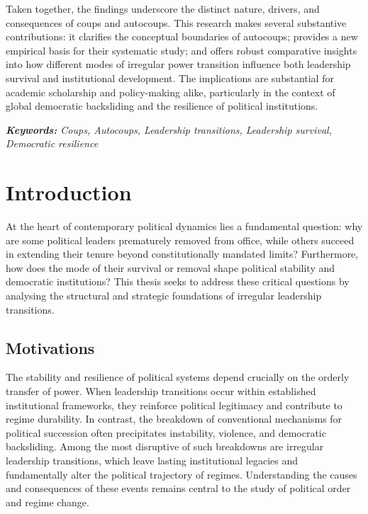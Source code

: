 \documentclass[
  12pt,
]{report}
\begin{document}
Taken together, the findings underscore the distinct nature, drivers,
and consequences of coups and autocoups. This research makes several
substantive contributions: it clarifies the conceptual boundaries of
autocoups; provides a new empirical basis for their systematic study;
and offers robust comparative insights into how different modes of
irregular power transition influence both leadership survival and
institutional development. The implications are substantial for academic
scholarship and policy-making alike, particularly in the context of
global democratic backsliding and the resilience of political
institutions.

\emph{\textbf{Keywords:} Coups, Autocoups, Leadership transitions,
Leadership survival, Democratic resilience}

\chapter{Introduction}\label{introduction}

At the heart of contemporary political dynamics lies a fundamental
question: why are some political leaders prematurely removed from
office, while others succeed in extending their tenure beyond
constitutionally mandated limits? Furthermore, how does the mode of
their survival or removal shape political stability and democratic
institutions? This thesis seeks to address these critical questions by
analysing the structural and strategic foundations of irregular
leadership transitions.

\section{Motivations}\label{motivations}

The stability and resilience of political systems depend crucially on
the orderly transfer of power. When leadership transitions occur within
established institutional frameworks, they reinforce political
legitimacy and contribute to regime durability. In contrast, the
breakdown of conventional mechanisms for political succession often
precipitates instability, violence, and democratic backsliding. Among
the most disruptive of such breakdowns are irregular leadership
transitions, which leave lasting institutional legacies and
fundamentally alter the political trajectory of regimes. Understanding
the causes and consequences of these events remains central to the study
of political order and regime change.
\end{document}
